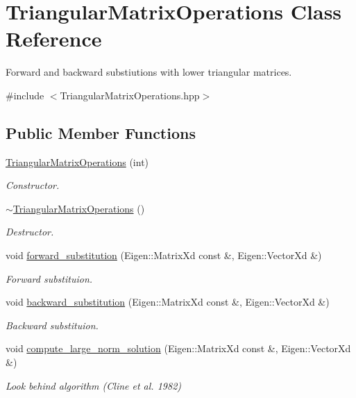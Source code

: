 \hypertarget{class_triangular_matrix_operations}{}\section{Triangular\+Matrix\+Operations Class Reference}
\label{class_triangular_matrix_operations}


Forward and backward substiutions with lower triangular matrices.  




{\ttfamily \#include $<$Triangular\+Matrix\+Operations.\+hpp$>$}

\subsection*{Public Member Functions}
\begin{DoxyCompactItemize}
\item 
\hyperlink{class_triangular_matrix_operations_a1749af677a1b6dbfc49f79460e63560f}{Triangular\+Matrix\+Operations} (int)
\begin{DoxyCompactList}\small\item\em Constructor. \end{DoxyCompactList}\item 
\hyperlink{class_triangular_matrix_operations_a49430aa1f10b868a9d1c9ca5a6e5b4a5}{$\sim$\+Triangular\+Matrix\+Operations} ()\hypertarget{class_triangular_matrix_operations_a49430aa1f10b868a9d1c9ca5a6e5b4a5}{}\label{class_triangular_matrix_operations_a49430aa1f10b868a9d1c9ca5a6e5b4a5}

\begin{DoxyCompactList}\small\item\em Destructor. \end{DoxyCompactList}\item 
void \hyperlink{class_triangular_matrix_operations_ac6c241a7c050029b89effd04c2def0d2}{forward\+\_\+substitution} (Eigen\+::\+Matrix\+Xd const \&, Eigen\+::\+Vector\+Xd \&)
\begin{DoxyCompactList}\small\item\em Forward substituion. \end{DoxyCompactList}\item 
void \hyperlink{class_triangular_matrix_operations_aec223544506e301ea27fd62af7c8e7a1}{backward\+\_\+substitution} (Eigen\+::\+Matrix\+Xd const \&, Eigen\+::\+Vector\+Xd \&)
\begin{DoxyCompactList}\small\item\em Backward substituion. \end{DoxyCompactList}\item 
void \hyperlink{class_triangular_matrix_operations_a6fa723c733723e90bd18fd6a638b5a79}{compute\+\_\+large\+\_\+norm\+\_\+solution} (Eigen\+::\+Matrix\+Xd const \&, Eigen\+::\+Vector\+Xd \&)
\begin{DoxyCompactList}\small\item\em Look behind algorithm (Cline et al. 1982) \end{DoxyCompactList}\end{DoxyCompactItemize}


